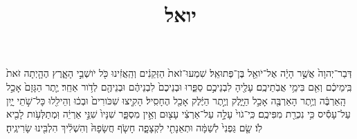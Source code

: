 \documentclass{openreader}
\title{יואל}
\date{}
\begin{document}
\maketitle
\raggedbottom 
\fontsize{16pt}{24pt}\selectfont


דְּבַר־יְהוָה֙ אֲשֶׁ֣ר הָיָ֔ה אֶל־יֹואֵ֖ל בֶּן־פְּתוּאֵֽל׃ 
שִׁמְעוּ־זֹאת֙ הַזְּקֵנִ֔ים וְהַֽאֲזִ֔ינוּ כֹּ֖ל יֹושְׁבֵ֣י הָאָ֑רֶץ הֶהָ֤יְתָה זֹּאת֙ בִּֽימֵיכֶ֔ם וְאִ֖ם בִּימֵ֥י אֲבֹֽתֵיכֶֽם׃ 
עָלֶ֖יהָ לִבְנֵיכֶ֣ם סַפֵּ֑רוּ וּבְנֵיכֶם֙ לִבְנֵיהֶ֔ם וּבְנֵיהֶ֖ם לְדֹ֥ור אַחֵֽר׃ 
יֶ֤תֶר הַגָּזָם֙ אָכַ֣ל הָֽאַרְבֶּ֔ה וְיֶ֥תֶר הָאַרְבֶּ֖ה אָכַ֣ל הַיָּ֑לֶק וְיֶ֣תֶר הַיֶּ֔לֶק אָכַ֖ל הֶחָסִֽיל׃ 
הָקִ֤יצוּ שִׁכֹּורִים֙ וּבְכ֔וּ וְהֵילִ֖לוּ כָּל־שֹׁ֣תֵי יָ֑יִן עַל־עָסִ֕יס כִּ֥י נִכְרַ֖ת מִפִּיכֶֽם׃ 
כִּֽי־גֹוי֙ עָלָ֣ה עַל־אַרְצִ֔י עָצ֖וּם וְאֵ֣ין מִסְפָּ֑ר שִׁנָּיו֙ שִׁנֵּ֣י אַרְיֵ֔ה וּֽמְתַלְּעֹ֥ות לָבִ֖יא לֹֽו׃ 
שָׂ֤ם גַּפְנִי֙ לְשַׁמָּ֔ה וּתְאֵנָתִ֖י לִקְצָפָ֑ה חָשֹׂ֤ף חֲשָׂפָהּ֙ וְהִשְׁלִ֔יךְ הִלְבִּ֖ינוּ שָׂרִיגֶֽיהָ׃ 
\end{document}
